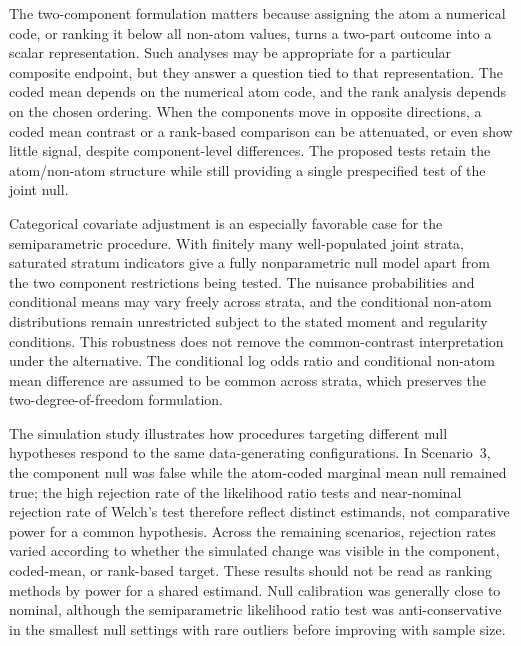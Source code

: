 \documentclass[11pt]{article}
\begin{document}
The two-component formulation matters because assigning the atom a numerical code, or ranking it below all non-atom values, turns a two-part outcome into a scalar representation. Such analyses may be appropriate for a particular composite endpoint, but they answer a question tied to that representation. The coded mean depends on the numerical atom code, and the rank analysis depends on the chosen ordering. When the components move in opposite directions, a coded mean contrast or a rank-based comparison can be attenuated, or even show little signal, despite component-level differences. The proposed tests retain the atom/non-atom structure while still providing a single prespecified test of the joint null.

Categorical covariate adjustment is an especially favorable case for the semiparametric procedure. With finitely many well-populated joint strata, saturated stratum indicators give a fully nonparametric null model apart from the two component restrictions being tested. The nuisance probabilities and conditional means may vary freely across strata, and the conditional non-atom distributions remain unrestricted subject to the stated moment and regularity conditions. This robustness does not remove the common-contrast interpretation under the alternative. The conditional log odds ratio and conditional non-atom mean difference are assumed to be common across strata, which preserves the two-degree-of-freedom formulation.

The simulation study illustrates how procedures targeting different null hypotheses respond to the same data-generating configurations. In Scenario~3, the component null was false while the atom-coded marginal mean null remained true; the high rejection rate of the likelihood ratio tests and near-nominal rejection rate of Welch's test therefore reflect distinct estimands, not comparative power for a common hypothesis. Across the remaining scenarios, rejection rates varied according to whether the simulated change was visible in the component, coded-mean, or rank-based target. These results should not be read as ranking methods by power for a shared estimand. Null calibration was generally close to nominal, although the semiparametric likelihood ratio test was anti-conservative in the smallest null settings with rare outliers before improving with sample size.
\end{document}
